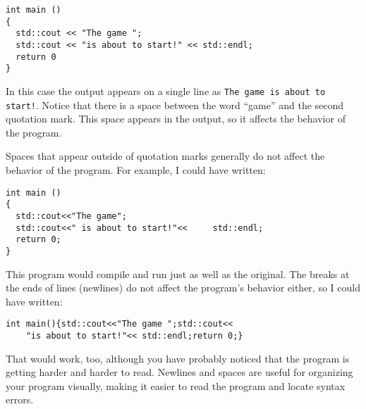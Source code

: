 \begin{lstlisting}
int main ()
{
  std::cout << "The game ";
  std::cout << "is about to start!" << std::endl;
  return 0
}
\end{lstlisting}

In this case the output appears on a single line as
{\tt The game is about to start!}.  Notice that there is a space
between the word ``game'' and the second quotation mark.
This space appears in the output, so it affects the behavior
of the program.

Spaces that appear outside of quotation marks generally do
not affect the behavior of the program.  For example, I
could have written:

\begin{lstlisting}
int main ()
{
  std::cout<<"The game";
  std::cout<<" is about to start!"<<     std::endl;
  return 0;
}
\end{lstlisting}

This program would compile and run just as well as the original.
The breaks at the ends of lines (newlines) do not affect
the program's behavior either, so I could have written:

\begin{lstlisting}
int main(){std::cout<<"The game ";std::cout<<
    "is about to start!"<< std::endl;return 0;}
\end{lstlisting}

That would work, too, although you have probably noticed that
the program is getting harder and harder to read.  Newlines and
spaces are useful for organizing your program visually, making
it easier to read the program and locate syntax errors.

